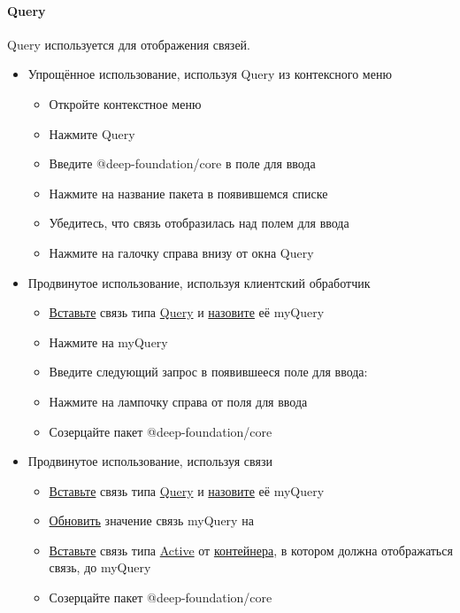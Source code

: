 \paragraph{Query}
Query используется для отображения связей.
\newcommand{\DeepCaseQueryByUsingContextMenu}{%
      Упрощённое использование, используя Query из контексного меню
      \begin{itemize}
            \item Откройте контекстное меню
            \item Нажмите Query
            \item Введите @deep-foundation/core в поле для ввода
            \item Нажмите на название пакета в появившемся списке
            \item Убедитесь, что связь отобразилась над полем для ввода
            \item Нажмите на галочку справа внизу от окна Query
      \end{itemize}%
}
\newcommand{\DeepCaseQueryByUsingClientHandler}{%
      Продвинутое использование, используя клиентский обработчик
      \begin{itemize}
            \item \hyperlink{DeepCase.InsertLink.Description}{Вставьте} связь типа
                  \hyperlink{Core.Query.Description}{Query} и
                  \hyperlink{FAQ.HowToSetName}{назовите} её myQuery
            \item Нажмите на myQuery
            \item Введите следующий запрос в появившееся поле для ввода: 
            \item Нажмите на лампочку справа от поля для ввода
            \item Созерцайте пакет @deep-foundation/core
      \end{itemize}%
}
\newcommand{\DeepCaseQueryByUsingLinks}{%
      Продвинутое использование, используя связи
      \begin{itemize}
            \item \hyperlink{DeepCase.InsertLink.Description}{Вставьте}
                  связь типа \hyperlink{Core.Query.Description}{Query} и
                  \hyperlink{FAQ.HowToSetName}{назовите} её myQuery
            \item \hyperlink{DeepCase.UpdatetLink.Description}{Обновить}
                  значение связь myQuery на 
            \item \hyperlink{DeepCase.InsertLink.Description}{Вставьте}
                  связь типа \hyperlink{Core.Active.Description}{Active} от
                  \hyperlink{Container.Description}{контейнера}, в котором должна отображаться
                  связь, до myQuery
            \item Созерцайте пакет @deep-foundation/core
      \end{itemize}%
}
\newcommand{\DeepCaseQueryUsing}{
      \begin{itemize}
            \item \DeepCaseQueryByUsingContextMenu
            \item \DeepCaseQueryByUsingClientHandler
            \item \DeepCaseQueryByUsingLinks
      \end{itemize}
}
\DeepCaseQueryUsing


